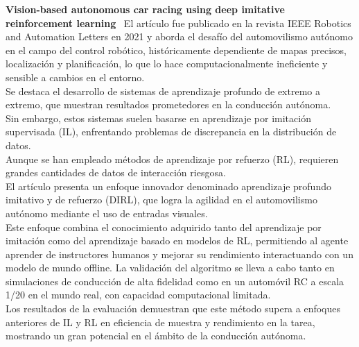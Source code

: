 \noindent\textbf{Vision-based autonomous car racing using deep imitative reinforcement learning}~\cite{cai2021vision}
El artículo fue publicado en la revista IEEE Robotics and Automation Letters en 2021 y aborda el desafío del automovilismo autónomo
en el campo del control robótico, históricamente dependiente de mapas precisos, localización y planificación, lo que lo hace
computacionalmente ineficiente y sensible a cambios en el entorno.
\\
Se destaca el desarrollo de sistemas de aprendizaje profundo de extremo a extremo, que muestran resultados prometedores en la conducción
autónoma.
\\
Sin embargo, estos sistemas suelen basarse en aprendizaje por imitación supervisada (IL), enfrentando problemas de discrepancia
en la distribución de datos.
\\
Aunque se han empleado métodos de aprendizaje por refuerzo (RL), requieren grandes cantidades de datos de interacción riesgosa.
\\
El artículo presenta un enfoque innovador denominado aprendizaje profundo imitativo y de refuerzo (DIRL), que logra la agilidad en
el automovilismo autónomo mediante el uso de entradas visuales.
\\
Este enfoque combina el conocimiento adquirido tanto del aprendizaje por imitación como del aprendizaje basado en modelos de RL,
permitiendo al agente aprender de instructores humanos y mejorar su rendimiento interactuando con un modelo de mundo offline.
La validación del algoritmo se lleva a cabo tanto en simulaciones de conducción de alta fidelidad como en un automóvil RC a escala 1/20 en
el mundo real, con capacidad computacional limitada. \\
Los resultados de la evaluación demuestran que este método supera a enfoques anteriores de IL y RL en eficiencia de muestra y rendimiento
en la tarea, mostrando un gran potencial en el ámbito de la conducción autónoma.
